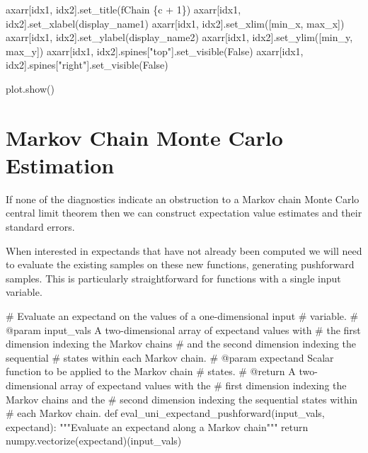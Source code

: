 \documentclass[
  letterpaper,
  DIV=11,
  numbers=noendperiod]{scrartcl}
\newenvironment{Shaded}{\begin{snugshade}}{\end{snugshade}}
\newcommand{\CommentTok}[1]{\textcolor[rgb]{0.37,0.37,0.37}{#1}}
\newcommand{\ControlFlowTok}[1]{\textcolor[rgb]{0.00,0.23,0.31}{#1}}
\newcommand{\DecValTok}[1]{\textcolor[rgb]{0.68,0.00,0.00}{#1}}
\newcommand{\KeywordTok}[1]{\textcolor[rgb]{0.00,0.23,0.31}{#1}}
\newcommand{\NormalTok}[1]{\textcolor[rgb]{0.00,0.23,0.31}{#1}}
\newcommand{\OperatorTok}[1]{\textcolor[rgb]{0.37,0.37,0.37}{#1}}
\newcommand{\SpecialCharTok}[1]{\textcolor[rgb]{0.37,0.37,0.37}{#1}}
\newcommand{\SpecialStringTok}[1]{\textcolor[rgb]{0.13,0.47,0.30}{#1}}
\newcommand{\StringTok}[1]{\textcolor[rgb]{0.13,0.47,0.30}{#1}}
\newcommand{\VariableTok}[1]{\textcolor[rgb]{0.07,0.07,0.07}{#1}}
\begin{document}
\begin{Shaded}
\begin{Highlighting}[]
\NormalTok{    axarr[idx1, idx2].set\_title(}\SpecialStringTok{f\textquotesingle{}Chain }\SpecialCharTok{\{}\NormalTok{c }\OperatorTok{+} \DecValTok{1}\SpecialCharTok{\}}\SpecialStringTok{\textquotesingle{}}\NormalTok{)}
\NormalTok{    axarr[idx1, idx2].set\_xlabel(display\_name1)}
\NormalTok{    axarr[idx1, idx2].set\_xlim([min\_x, max\_x])}
\NormalTok{    axarr[idx1, idx2].set\_ylabel(display\_name2)}
\NormalTok{    axarr[idx1, idx2].set\_ylim([min\_y, max\_y])}
\NormalTok{    axarr[idx1, idx2].spines[}\StringTok{"top"}\NormalTok{].set\_visible(}\VariableTok{False}\NormalTok{)}
\NormalTok{    axarr[idx1, idx2].spines[}\StringTok{"right"}\NormalTok{].set\_visible(}\VariableTok{False}\NormalTok{)}

\NormalTok{  plot.show()}
\end{Highlighting}
\end{Shaded}

\section{Markov Chain Monte Carlo
Estimation}\label{markov-chain-monte-carlo-estimation}

If none of the diagnostics indicate an obstruction to a Markov chain
Monte Carlo central limit theorem then we can construct expectation
value estimates and their standard errors.

When interested in expectands that have not already been computed we
will need to evaluate the existing samples on these new functions,
generating pushforward samples. This is particularly straightforward for
functions with a single input variable.

\begin{Shaded}
\begin{Highlighting}[]
\CommentTok{\# Evaluate an expectand on the values of a one{-}dimensional input}
\CommentTok{\# variable.}
\CommentTok{\# @param input\_vals A two{-}dimensional array of expectand values with}
\CommentTok{\#                   the first dimension indexing the Markov chains}
\CommentTok{\#                   and the second dimension indexing the sequential}
\CommentTok{\#                   states within each Markov chain.}
\CommentTok{\# @param expectand Scalar function to be applied to the Markov chain}
\CommentTok{\#                  states.}
\CommentTok{\# @return A two{-}dimensional array of expectand values with the}
\CommentTok{\#         first dimension indexing the Markov chains and the}
\CommentTok{\#         second dimension indexing the sequential states within}
\CommentTok{\#         each Markov chain.}
\KeywordTok{def}\NormalTok{ eval\_uni\_expectand\_pushforward(input\_vals, expectand):}
  \CommentTok{"""Evaluate an expectand along a Markov chain"""}
  \ControlFlowTok{return}\NormalTok{ numpy.vectorize(expectand)(input\_vals)}
\end{Highlighting}
\end{Shaded}
\end{document}
